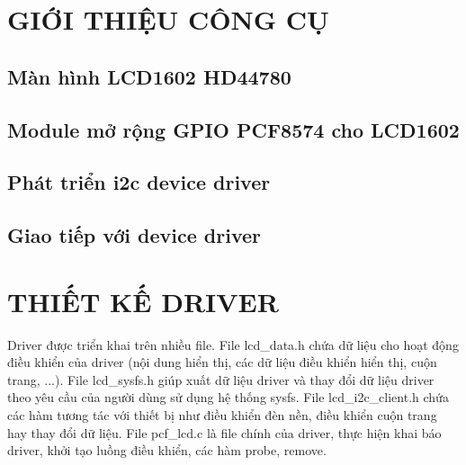 \documentclass{report}
\begin{document}



\chapter{GIỚI THIỆU CÔNG CỤ}
\section{Màn hình LCD1602 HD44780}

\section{Module mở rộng GPIO PCF8574 cho LCD1602}


\section{Phát triển \acrshort{i2c} device driver}

\section {Giao tiếp với device driver}

\chapter{THIẾT KẾ DRIVER}

Driver được triển khai trên nhiều file. File lcd\_data.h chứa dữ liệu cho hoạt động điều khiển của driver (nội dung hiển thị, các dữ liệu điều khiển hiển thị, cuộn trang, ...).  File lcd\_sysfs.h giúp xuất dữ liệu driver và thay đổi dữ liệu driver theo yêu cầu của người dùng sử dụng hệ thống sysfs. File lcd\_i2c\_client.h chứa các hàm tương tác với thiết bị như điều khiển đèn nền, điều khiển cuộn trang hay thay đổi dữ liệu. File pcf\_lcd.c là file chính của driver, thực hiện khai báo driver, khởi tạo luồng điều khiển, các hàm probe, remove.
\end{document}
